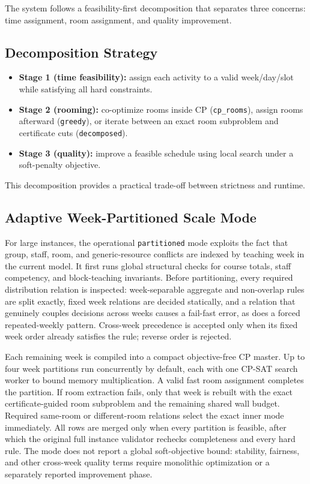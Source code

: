 The system follows a feasibility-first decomposition that separates three concerns:
time assignment, room assignment, and quality improvement.

\subsection{Decomposition Strategy}
\begin{itemize}[leftmargin=*]
  \item \textbf{Stage 1 (time feasibility):} assign each activity to a valid week/day/slot while satisfying all hard constraints.
  \item \textbf{Stage 2 (rooming):} co-optimize rooms inside CP (\texttt{cp\_rooms}), assign rooms afterward (\texttt{greedy}), or iterate between an exact room subproblem and certificate cuts (\texttt{decomposed}).
  \item \textbf{Stage 3 (quality):} improve a feasible schedule using local search under a soft-penalty objective.
\end{itemize}
This decomposition provides a practical trade-off between strictness and runtime.

\subsection{Adaptive Week-Partitioned Scale Mode}
For large instances, the operational \texttt{partitioned} mode exploits the fact that group, staff, room, and generic-resource conflicts are indexed by teaching week in the current model.
It first runs global structural checks for course totals, staff competency, and block-teaching invariants.
Before partitioning, every required distribution relation is inspected: week-separable aggregate and non-overlap rules are split exactly, fixed week relations are decided statically, and a relation that genuinely couples decisions across weeks causes a fail-fast error, as does a forced repeated-weekly pattern.
Cross-week precedence is accepted only when its fixed week order already satisfies the rule; reverse order is rejected.

Each remaining week is compiled into a compact objective-free CP master.
Up to four week partitions run concurrently by default, each with one CP-SAT search worker to bound memory multiplication.
A valid fast room assignment completes the partition.
If room extraction fails, only that week is rebuilt with the exact certificate-guided room subproblem and the remaining shared wall budget.
Required same-room or different-room relations select the exact inner mode immediately.
All rows are merged only when every partition is feasible, after which the original full instance validator rechecks completeness and every hard rule.
The mode does not report a global soft-objective bound: stability, fairness, and other cross-week quality terms require monolithic optimization or a separately reported improvement phase.

